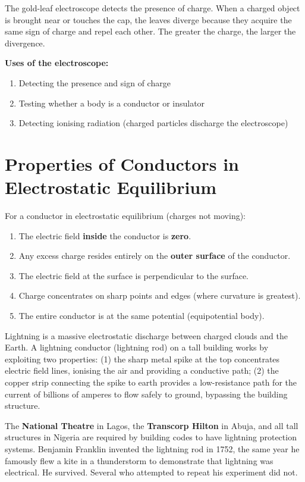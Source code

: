 The gold-leaf electroscope detects the presence of
charge. When a charged object is brought near or
touches the cap, the leaves diverge because they
acquire the same sign of charge and repel each other.
The greater the charge, the larger the divergence.

\textbf{Uses of the electroscope:}
\begin{enumerate}[noitemsep]
  \item Detecting the presence and sign of charge
  \item Testing whether a body is a conductor or
  insulator
  \item Detecting ionising radiation (charged
  particles discharge the electroscope)
\end{enumerate}

\section{Properties of Conductors in Electrostatic
Equilibrium}

\begin{lawbox}
For a conductor in electrostatic equilibrium (charges
not moving):
\begin{enumerate}[noitemsep]
  \item The electric field \textbf{inside} the
  conductor is \textbf{zero}.
  \item Any excess charge resides entirely on the
  \textbf{outer surface} of the conductor.
  \item The electric field at the surface is
  perpendicular to the surface.
  \item Charge concentrates on sharp points and
  edges (where curvature is greatest).
  \item The entire conductor is at the same
  potential (equipotential body).
\end{enumerate}
\end{lawbox}

\begin{realworldbox}
Lightning is a massive electrostatic discharge
between charged clouds and the Earth. A lightning
conductor (lightning rod) on a tall building works
by exploiting two properties: (1) the sharp metal
spike at the top concentrates electric field lines,
ionising the air and providing a conductive path;
(2) the copper strip connecting the spike to earth
provides a low-resistance path for the current of
billions of amperes to flow safely to ground,
bypassing the building structure.

The \textbf{National Theatre} in Lagos, the
\textbf{Transcorp Hilton} in Abuja, and all tall
structures in Nigeria are required by building codes
to have lightning protection systems. Benjamin
Franklin invented the lightning rod in 1752, the
same year he famously flew a kite in a thunderstorm
to demonstrate that lightning was electrical. He
survived. Several who attempted to repeat his
experiment did not.
\end{realworldbox}

